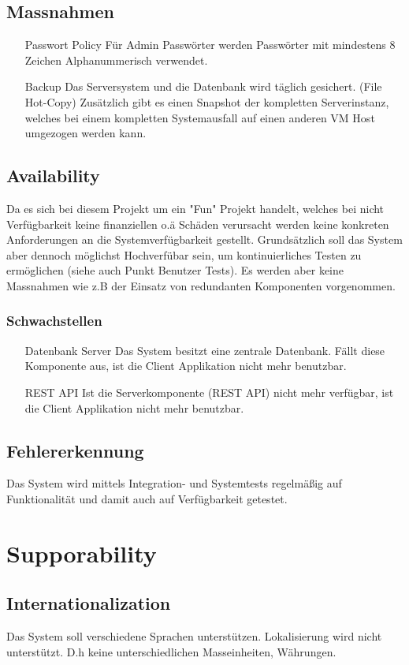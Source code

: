 \documentclass[10pt,a4paper]{scrartcl}
\begin{document}
\subsection{Massnahmen}
\begin{enumerate}
\item[Passwort Policy]
Für Admin Passwörter werden Passwörter mit mindestens 8 Zeichen Alphanummerisch verwendet.
\item[Backup]
Das Serversystem und die Datenbank wird täglich gesichert. (File Hot-Copy)
Zusätzlich gibt es einen Snapshot der kompletten Serverinstanz, welches bei einem kompletten Systemausfall auf einen anderen VM Host umgezogen werden kann.
 
\end{enumerate}
\subsection{Availability}
Da es sich bei diesem Projekt um ein "Fun" Projekt handelt, welches bei nicht Verfügbarkeit keine finanziellen o.ä Schäden verursacht werden keine konkreten Anforderungen an die Systemverfügbarkeit gestellt. Grundsätzlich soll das System aber dennoch möglichst Hochverfübar sein, um kontinuierliches Testen zu ermöglichen (siehe auch Punkt Benutzer Tests). Es werden aber keine Massnahmen wie z.B der Einsatz von redundanten Komponenten vorgenommen.
\subsubsection{Schwachstellen}
\begin{enumerate}
\item[Datenbank Server]
Das System besitzt eine zentrale Datenbank. Fällt diese Komponente aus, ist die Client Applikation nicht mehr benutzbar.
\item[REST API]
Ist die Serverkomponente (REST API) nicht mehr verfügbar, ist die Client Applikation nicht mehr benutzbar.
\end{enumerate}
\subsection{Fehlererkennung}
Das System wird mittels Integration- und Systemtests regelmäßig auf Funktionalität und damit auch auf Verfügbarkeit getestet.
\section{Supporability}
\subsection{Internationalization}
Das System soll verschiedene Sprachen unterstützen. Lokalisierung wird nicht unterstützt. D.h keine unterschiedlichen Masseinheiten, Währungen.
\end{document}
